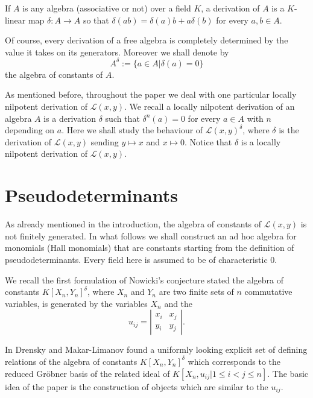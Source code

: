 \documentclass{cimart}
\begin{document}
\begin{definition}
If $A$ is any algebra (associative or not) over a field $K$, a derivation of $A$ is a $K$-linear map $\delta:A\rightarrow A$ so that $\delta(ab)=\delta(a)b+a\delta(b)$ for every $a,b\in A$.
\end{definition}

Of course, every derivation of a free algebra is completely determined by the value it takes on its generators. Moreover we shall denote by 
\[A^\delta:=\{a\in A|\delta(a)=0\}\]
the algebra of constants of $A$.

As mentioned before, throughout the paper we deal with one particular locally nilpotent derivation of $\mathcal{L}(x,y)$. We recall a locally nilpotent derivation of an algebra $A$ is a derivation $\delta$ such that $\delta^n(a)=0$ for every $a\in A$ with $n$ depending on $a$. Here we shall study the behaviour of $\mathcal{L}(x,y)^\delta$, where $\delta$ is the derivation of $\mathcal{L}(x,y)$ sending $y\mapsto x$ and $x\mapsto0$. Notice that $\delta$ is a locally nilpotent derivation of $\mathcal{L}(x,y)$.

\section{Pseudodeterminants}

As already mentioned in the introduction, the algebra of constants of $\mathcal{L}(x,y)$ is not finitely generated. In what follows we shall construct an ad hoc algebra for monomials (Hall monomials) that are constants starting from the definition of pseudodeterminants. Every field here is assumed to be of characteristic 0.

We recall the first formulation of Nowicki's conjecture stated the algebra of constants $K[X_n,Y_n]^\delta$, where $X_n$ and $Y_n$ are two finite sets of $n$ commutative variables, is generated by the variables $X_n$ and the
\[
u_{ij}=\left |\begin{array}{cc}
x_i & x_j\\
y_i & y_j	
\end{array}\right|.
\]

In \cite{DML} Drensky and Makar-Limanov found a uniformly looking explicit set of defining relations of the algebra of constants $K[X_n,Y_n]^\delta$ which corresponds to the reduced Gr\"obner basis
of the related ideal of $K[X_n,u_{ij} | 1\leq i< j\leq n]$. The basic idea of the paper is the construction of objects which are similar to the  $u_{ij}$.
\end{document}
